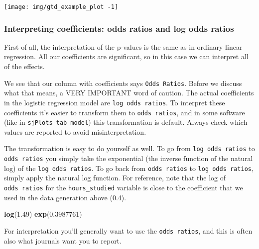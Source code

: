 \documentclass[
]{article}
\newenvironment{Shaded}{\begin{snugshade}}{\end{snugshade}}
\newcommand{\FloatTok}[1]{\textcolor[rgb]{0.00,0.00,0.81}{#1}}
\newcommand{\KeywordTok}[1]{\textcolor[rgb]{0.13,0.29,0.53}{\textbf{#1}}}
\newcommand{\NormalTok}[1]{#1}
\begin{document}
\begin{center}\texttt{[image: img/gtd\_example\_plot -1]} \end{center}

\hypertarget{interpreting-coefficients-odds-ratios-and-log-odds-ratios}{%
\subsubsection{Interpreting coefficients: odds ratios and log odds
ratios}\label{interpreting-coefficients-odds-ratios-and-log-odds-ratios}}

First of all, the interpretation of the p-values is the same as in
ordinary linear regression. All our coefficients are significant, so in
this case we can interpret all of the effects.

We see that our column with coefficients says \texttt{Odds\ Ratios}.
Before we discuss what that means, a VERY IMPORTANT word of caution. The
actual coefficients in the logistic regression model are
\texttt{log\ odds\ ratios}. To interpret these coefficients it's easier
to transform them to \texttt{odds\ ratios}, and in some software (like
in \texttt{sjPlot\textquotesingle{}s\ tab\_model}) this transformation
is default. Always check which values are reported to avoid
misinterpretation.

The transformation is easy to do yourself as well. To go from
\texttt{log\ odds\ ratios} to \texttt{odds\ ratios} you simply take the
exponential (the inverse function of the natural log) of the
\texttt{log\ odds\ ratios}. To go back from \texttt{odds\ ratios} to
\texttt{log\ odds\ ratios}, simply apply the natural log function. For
reference, note that the log of \texttt{odds\ ratios} for the
\texttt{hours\_studied} variable is close to the coefficient that we
used in the data generation above (0.4).

\begin{Shaded}
\begin{Highlighting}[]
\KeywordTok{log}\NormalTok{(}\FloatTok{1.49}\NormalTok{)}
\KeywordTok{exp}\NormalTok{(}\FloatTok{0.3987761}\NormalTok{)}
\end{Highlighting}
\end{Shaded}

For interpretation you'll generally want to use the
\texttt{odds\ ratios}, and this is often also what journals want you to
report.
\end{document}
